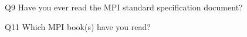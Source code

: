 \begin{description}%
\item{Q9} Have you ever read the MPI standard specification document?%
\item{Q11} Which MPI book(s) have you read?%
\end{description}%
